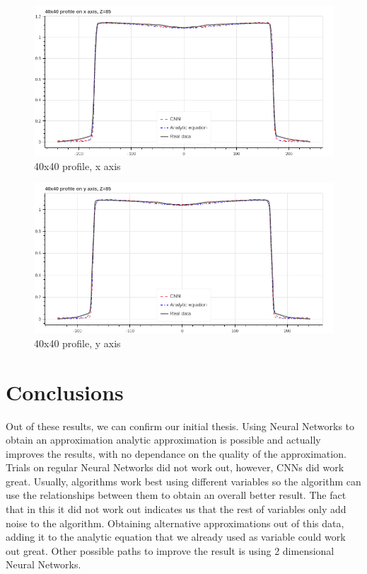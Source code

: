 \documentclass[openany]{article}
\begin{document}
\newpage 

\begin{figure}[!h]
    \centering
    \includegraphics[width=\textwidth]{40_40_x_axis.png}
    \caption{40x40 profile, x axis}
    \label{fig:my_label}
\end{figure}


\begin{figure}[!h]
    \centering
    \includegraphics[width=\textwidth]{40_40_y_axis.png}
    \caption{40x40 profile, y axis}
    \label{fig:my_label}
\end{figure}


\newpage

\newpage

\section{Conclusions}

Out of these results, we can confirm our initial thesis. Using Neural Networks to obtain an approximation analytic approximation is possible and actually improves the results, with no dependance on the quality of the approximation. Trials on regular Neural Networks did not work out, however, CNNs did work great. Usually, algorithms work best using different variables so the algorithm can use the relationships between them to obtain an overall better result. The fact that in this it did not work out indicates us that the rest of variables only add noise to the algorithm. Obtaining alternative approximations out of this data, adding it to the analytic equation that we already used as variable could work out great. Other possible paths to improve the result is using 2 dimensional Neural Networks. 
\end{document}
